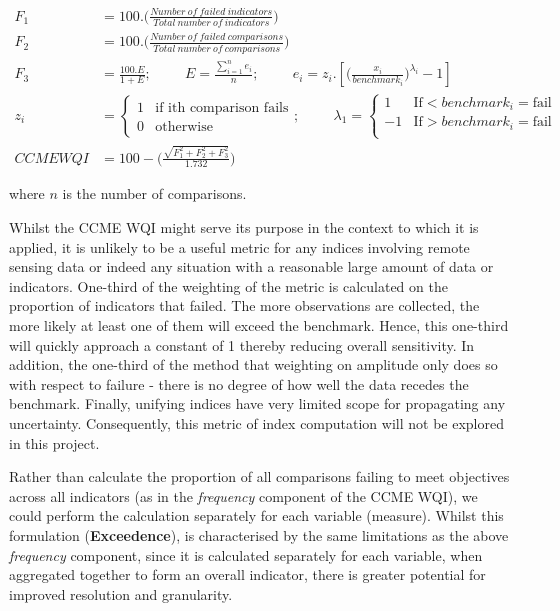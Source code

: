 $$
\begin{flalign*} F_1 &=
100.\bigg(\frac{Number~of~failed~indicators}{Total~number~of~indicators}\bigg)\\ F_2 &=
100.\bigg(\frac{Number~of~failed~comparisons}{Total~number~of~comparisons}\bigg)\\ F_3 &=
\frac{100.E}{1+E};\hspace{1cm} E=\frac{\sum^n_{i=1} e_i}{n};\hspace{1cm} e_i
=z_i.\left[\bigg(\frac{x_i}{benchmark_i}\bigg)^{\lambda_i} - 1\right]\\ z_i &= \begin{cases} 1 &
\text{if ith comparison fails}\\ 0 & \text{otherwise}
\end{cases}; \hspace{1cm} \lambda_1 = \begin{cases} 1 & \text{If} < benchmark_i = \text{fail}\\ -1 &
\text{If} > benchmark_i = \text{fail}\\
\end{cases}\\ CCME WQI &=100-\Bigg(\frac{\sqrt{F_1^2 + F_2^2 + F_3^2}}{1.732}\Bigg)
\end{flalign*}
$$

where $n$ is the number of comparisons.


Whilst the CCME WQI might serve its purpose in the context to which it is applied, it is unlikely to
be a useful metric for any indices involving remote sensing data or indeed any situation with a
reasonable large amount of data or indicators. One-third of the weighting of the metric is
calculated on the proportion of indicators that failed.  The more observations are collected, the
more likely at least one of them will exceed the benchmark.  Hence, this one-third will quickly
approach a constant of 1 thereby reducing overall sensitivity.  In addition, the one-third of the
method that weighting on amplitude only does so with respect to failure - there is no degree of how
well the data recedes the benchmark.
Finally, unifying indices have very limited scope for
propagating any uncertainty.  Consequently, this metric of index computation will not be explored in
this project.

Rather than calculate the proportion of all comparisons failing to meet objectives across all indicators
(as in the \textit{frequency} component of the CCME WQI), we could perform the calculation separately
for each variable (measure).  Whilst this formulation (\textbf{Exceedence}), is characterised by the same limitations
as the above \textit{frequency} component, since it is calculated separately for each variable, when aggregated
together to form an overall indicator, there is greater potential for improved resolution and granularity.


